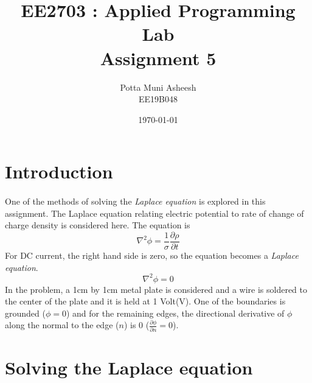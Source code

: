 \documentclass[12pt, a4paper]{article}
\title{\textbf{EE2703 : Applied Programming Lab \\ Assignment 5}} %
\author{Potta Muni Asheesh \\ EE19B048} %
\date{\today} %
\begin{document}
	
		
\maketitle %

\section{Introduction}

\paragraph*{}
One of the methods of solving the \textit{Laplace equation} is explored in this assignment. The Laplace equation relating electric potential to rate of change of charge density is considered here. The equation is
\begin{equation*}
\nabla^2 \phi = \frac{1}{\sigma} \frac{\partial\rho}{\partial t}
\end{equation*}
For DC current, the right hand side is zero, so the equation becomes a \textit{Laplace equation}.
\begin{equation*}
\nabla^2 \phi = 0
\end{equation*}
In the problem, a 1cm by 1cm metal plate is considered and a wire is soldered to the center of the plate and it is held at 1 Volt(V). One of the boundaries is grounded ($\phi = 0$) and for the remaining edges, the directional derivative of $\phi$ along the normal to the edge ($n$) is 0 ($\frac{\partial \phi}{\partial n} = 0$).

\section{Solving the Laplace equation}
\end{document}
